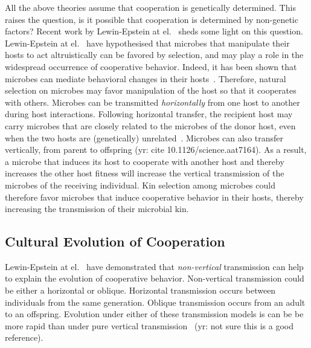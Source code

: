 \documentclass{article}
\begin{document}
All the above theories assume that cooperation is genetically determined. This raises the question, is it possible that cooperation is determined by non-genetic factors?
Recent work by Lewin-Epstein at el.~\cite{lewin2017microbes} sheds some light on this question. 
Lewin-Epstein at el.~\cite{lewin2017microbes} have hypothesised that microbes that manipulate their hosts to act altruistically can be favored by selection, and may play a role in the widespread occurrence of cooperative behavior. Indeed, it has been shown that microbes can mediate behavioral changes in their hosts~\cite{poulin2010parasite,dobson1988population}. Therefore, natural selection on microbes may favor manipulation of the host so that it cooperates with others. Microbes can be transmitted \emph{horizontally} from one host to another during host interactions. Following horizontal transfer, the recipient host may carry microbes that are closely related to the microbes of the donor host, even when the two hosts are (genetically) unrelated~\cite{lewin2017microbes}. Microbes can also transfer vertically, from parent to offspring (yr: cite 10.1126/science.aat7164). As a result, a microbe that induces its host to cooperate with another host and thereby increases the other host fitness will  increase the vertical transmission of the microbes of the receiving individual. Kin selection among microbes could therefore favor microbes that induce cooperative behavior in their hosts, thereby increasing the transmission of their microbial kin.

\subsection*{Cultural Evolution of Cooperation}
Lewin-Epstein at el.~\cite{lewin2017microbes} have demonstrated that \emph{non-vertical} transmission can help to explain the evolution of cooperative behavior. 
Non-vertical transmission could be either a horizontal or oblique. Horizontal transmission occurs between individuals from the same generation. Oblique transmission occurs from an adult to an offspring. 
Evolution under either of these transmission models is can be be more rapid than under pure vertical transmission~\cite{ram2018evolution} (yr: not sure this is a good reference).   
\end{document}
